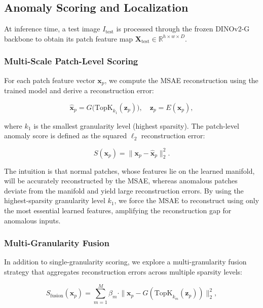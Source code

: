 \subsection{Anomaly Scoring and Localization}

At inference time, a test image $I_{\text{test}}$ is processed through the frozen DINOv2-G backbone to obtain its patch feature map $\mathbf{X}_{\text{test}} \in \mathbb{R}^{h \times w \times D}$.

\subsubsection{Multi-Scale Patch-Level Scoring}

For each patch feature vector $\mathbf{x}_p$, we compute the MSAE reconstruction using the trained model and derive a reconstruction error:

\begin{equation}
    \hat{\mathbf{x}}_p = G\big(\text{TopK}_{k_1}(\mathbf{z}_p)\big), \quad \mathbf{z}_p = E(\mathbf{x}_p),
    \label{eq:recon}
\end{equation}

where $k_1$ is the smallest granularity level (highest sparsity).
The patch-level anomaly score is defined as the squared $\ell_2$ reconstruction error:

\begin{equation}
    S(\mathbf{x}_p) = \|\mathbf{x}_p - \hat{\mathbf{x}}_p\|_2^2.
    \label{eq:score}
\end{equation}

The intuition is that normal patches, whose features lie on the learned manifold, will be accurately reconstructed by the MSAE, whereas anomalous patches deviate from the manifold and yield large reconstruction errors.
By using the highest-sparsity granularity level $k_1$, we force the MSAE to reconstruct using only the most essential learned features, amplifying the reconstruction gap for anomalous inputs.

\subsubsection{Multi-Granularity Fusion}

In addition to single-granularity scoring, we explore a multi-granularity fusion strategy that aggregates reconstruction errors across multiple sparsity levels:

\begin{equation}
    S_{\text{fusion}}(\mathbf{x}_p) = \sum_{m=1}^{M} \beta_m \cdot \|\mathbf{x}_p - G(\text{TopK}_{k_m}(\mathbf{z}_p))\|_2^2,
    \label{eq:fusion_score}
\end{equation}


